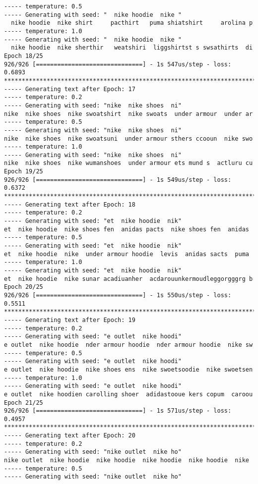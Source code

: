\documentclass[11pt]{article}
\begin{document}
\begin{Verbatim}[commandchars=\\\{\}]
----- temperature: 0.5
----- Generating with seed: "  nike hoodie  nike "
  nike hoodie  nike shirt     pacthirt   puma shiatshirt     arolina p
----- temperature: 1.0
----- Generating with seed: "  nike hoodie  nike "
  nike hoodie  nike sherthir   weatshiri  liggshirtst s swsathirts  di
Epoch 18/25
926/926 [==============================] - 1s 547us/step - loss: 0.6893
****************************************************************************
----- Generating text after Epoch: 17
----- temperature: 0.2
----- Generating with seed: "nike  nike shoes  ni"
nike  nike shoes  nike swoatshirt  nike swoats  under armour  under ar
----- temperature: 0.5
----- Generating with seed: "nike  nike shoes  ni"
nike  nike shoes  nike swoatsuni  under armour sthers ccooun  nike swo
----- temperature: 1.0
----- Generating with seed: "nike  nike shoes  ni"
nike  nike shoes  nike wumanshoes  under armour ets mund s  actluru cu
Epoch 19/25
926/926 [==============================] - 1s 549us/step - loss: 0.6372
****************************************************************************
----- Generating text after Epoch: 18
----- temperature: 0.2
----- Generating with seed: "et  nike hoodie  nik"
et  nike hoodie  nike shoes fen  anidas pacts  nike shoes fen  anidas
----- temperature: 0.5
----- Generating with seed: "et  nike hoodie  nik"
et  nike hoodie  nike  under armour hoodie  levis  anidas sacts  puma
----- temperature: 1.0
----- Generating with seed: "et  nike hoodie  nik"
et  nike hoodie  nike sunar acadiuanher  acdarouunkermoudleggorgggrg b
Epoch 20/25
926/926 [==============================] - 1s 550us/step - loss: 0.5511
****************************************************************************
----- Generating text after Epoch: 19
----- temperature: 0.2
----- Generating with seed: "e outlet  nike hoodi"
e outlet  nike hoodie  nder armour hoodie  nder armour hoodie  nike sw
----- temperature: 0.5
----- Generating with seed: "e outlet  nike hoodi"
e outlet  nike hoodie  nike shoes ens  nike swoetsoodie  nike swoetsen
----- temperature: 1.0
----- Generating with seed: "e outlet  nike hoodi"
e outlet  nike hoodien carolling shoer  adidastooue kers copum  caroou
Epoch 21/25
926/926 [==============================] - 1s 571us/step - loss: 0.4957
****************************************************************************
----- Generating text after Epoch: 20
----- temperature: 0.2
----- Generating with seed: "nike outlet  nike ho"
nike outlet  nike hoodie  nike hoodie  nike hoodie  nike hoodie  nike
----- temperature: 0.5
----- Generating with seed: "nike outlet  nike ho"

\end{Verbatim}
\end{document}
